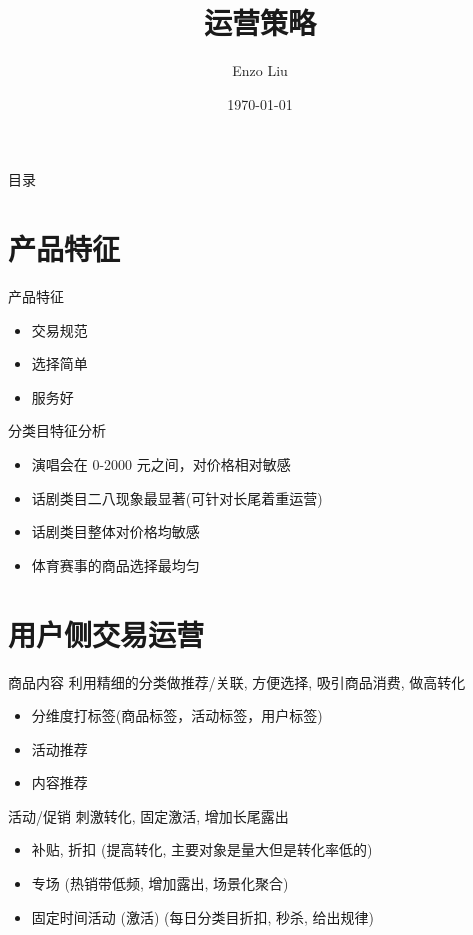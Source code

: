 \documentclass[presentation,bigger]{beamer}
\author{Enzo Liu}
\date{\today}
\title{运营策略}
\begin{document}
\maketitle
\begin{frame}{目录}
\tableofcontents
\end{frame}


\section{产品特征}
\label{sec:orgheadline3}
\begin{frame}[label={sec:orgheadline1}]{产品特征}
\begin{itemize}
\item 交易规范
\item 选择简单
\item 服务好
\end{itemize}
\end{frame}

\begin{frame}[label={sec:orgheadline2}]{分类目特征分析}
\begin{itemize}
\item 演唱会在 0-2000 元之间，对价格相对敏感
\item 话剧类目二八现象最显著(可针对长尾着重运营)
\item 话剧类目整体对价格均敏感
\item 体育赛事的商品选择最均匀
\end{itemize}
\end{frame}

\section{用户侧交易运营}
\label{sec:orgheadline7}
\begin{frame}[label={sec:orgheadline4}]{商品内容}
利用精细的分类做推荐/关联, 方便选择, 吸引商品消费, 做高转化
\begin{itemize}
\item 分维度打标签(商品标签，活动标签，用户标签)
\item 活动推荐
\item 内容推荐
\end{itemize}
\end{frame}

\begin{frame}[label={sec:orgheadline5}]{活动/促销}
刺激转化, 固定激活, 增加长尾露出
\begin{itemize}
\item 补贴, 折扣 (提高转化, 主要对象是量大但是转化率低的)
\item 专场 (热销带低频, 增加露出, 场景化聚合)
\item 固定时间活动 (激活) (每日分类目折扣, 秒杀, 给出规律)
\end{itemize}
\end{frame}
\end{document}
